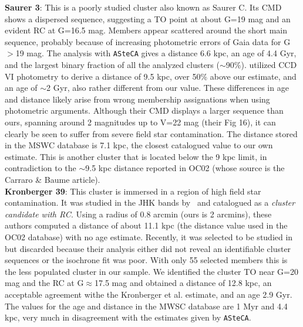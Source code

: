 \documentclass[draft]{aa}
\begin{document}
  \textbf{Saurer 3}: This is a poorly studied cluster also known as Saurer C.
  Its CMD shows a dispersed sequence, suggesting a TO point at about G=19 mag
  and an evident RC at G=16.5 mag. Members appear scattered around the short
  main sequence, probably because of increasing photometric errors of Gaia data
  for G$>$19 mag.
  The analysis with \texttt{ASteCA} gives a distance 6.6 kpc, an age of 4.4
  Gyr, and the largest binary fraction of all the analyzed clusters 
  ($\sim$90\%).
  \cite{Carraro_2003} utilized CCD VI photometry to derive a distance of 9.5
  kpc, over 50\% above our estimate, and an age of $\sim$2 Gyr, also rather
  different from our value. These differences in age and distance likely
  arise from wrong membership assignations when using photometric
  arguments. Although their CMD displays a larger sequence than
  ours, spanning around 2 magnitudes up to V=22 mag (their Fig 16), it can
  clearly be seen to suffer from severe field star contamination.
  The distance stored in the MSWC database is 7.1 kpc, the closest catalogued
  value to our own estimate. This is another cluster that is located below the 9
  kpc limit, in contradiction to the $\sim$9.5 kpc distance reported in
  OC02 (whose source is the Carraro \& Baume article).\\

  \textbf{Kronberger 39}: This cluster is immersed in a region of high field
  star contamination. It was studied in the JHK bands by~\cite{Kronberger_2006}
  and catalogued as a \emph{cluster candidate with RC}. Using a radius of 0.8
  arcmin (ours is 2 arcmins), these authors computed a distance of about 11.1
  kpc (the distance value used in the OC02 database) with no age estimate.
  Recently, it was selected to be studied in~\cite{Monteiro_2020} but
  discarded because their analysis either did not reveal an identifiable cluster
  sequences or the isochrone fit was poor.
  With only 55 selected members this is the less populated cluster in our
  sample. We identified the cluster TO near G=20 mag and the RC at
  G$\approx$17.5 mag and obtained a distance of 12.8 kpc, an acceptable
  agreement withe the Kronberger et al. estimate, and an age 2.9 Gyr.
  The values for the age and distance in the MWSC database are 1 Myr and 4.4
  kpc, very much in disagreement with the estimates given by \texttt{ASteCA}.\\
\end{document}
